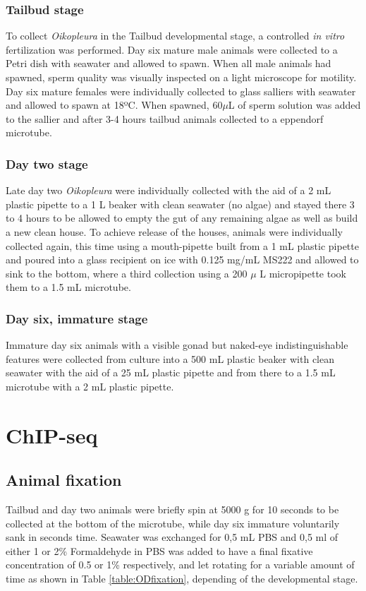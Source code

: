 \documentclass[11pt,twoside,a4paper]{report}
\begin{document}
			\subsubsection{Tailbud stage}
			\label{subsubsection:TailbudCollection}
			To collect \textit{Oikopleura} in the Tailbud developmental stage, a controlled \textit{in vitro} fertilization was performed. Day six mature male animals were collected to a Petri dish with seawater and allowed to spawn. When all male animals had spawned, sperm quality was visually inspected on a light microscope for motility. Day six mature females were individually collected to glass salliers with seawater and allowed to spawn at 18ºC. When spawned, 60$\mu$L of sperm solution was added to the sallier and after 3-4 hours tailbud animals collected to a eppendorf microtube.
			
			\subsubsection{Day two stage}
			Late day two \textit{Oikopleura} were individually collected with the aid of a 2 mL plastic pipette to a 1 L beaker with clean seawater (no algae) and stayed there 3 to 4 hours to be allowed to empty the gut of any remaining algae as well as build a new clean house.
			To achieve release of the houses, animals were individually collected again, this time using a mouth-pipette built from a 1 mL plastic pipette and poured into a glass recipient on ice with 0.125 mg/mL MS222 and allowed to sink to the bottom, where a third collection using a 200 $\mu$
			L micropipette took them to a 1.5 mL microtube.
			
			\subsubsection{Day six, immature stage}
			Immature day six animals with a visible gonad but naked-eye indistinguishable features were collected from culture into a 500 mL plastic beaker with clean seawater with the aid of a 25 mL plastic pipette and from there to a 1.5 mL microtube with a 2 mL plastic pipette. 
		
	
	\section{ChIP-seq}
		\subsection{Animal fixation}
			Tailbud and day two animals were briefly spin at 5000 g for 10 seconds to be collected at the bottom of the microtube, while day six immature voluntarily sank in seconds time. Seawater was exchanged for 0,5 mL PBS and 0,5 ml of either 1 or 2\% Formaldehyde in PBS was added to have a final fixative concentration of 0.5 or 1\% respectively, and let rotating for a variable amount of time as shown in Table \ref{table:ODfixation}, depending of the developmental stage.
			
\end{document}

